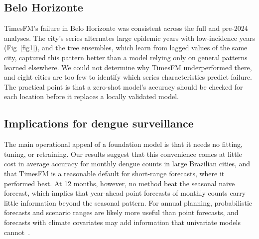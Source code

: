 \documentclass[10pt,letterpaper]{article}
\begin{document}
\subsection*{Belo Horizonte}
TimesFM's failure in Belo Horizonte was consistent across the full and pre-2024 analyses. The city's series alternates large epidemic years with low-incidence years (Fig~\ref{fig1}), and the tree ensembles, which learn from lagged values of the same city, captured this pattern better than a model relying only on general patterns learned elsewhere. We could not determine why TimesFM underperformed there, and eight cities are too few to identify which series characteristics predict failure. The practical point is that a zero-shot model's accuracy should be checked for each location before it replaces a locally validated model.

\subsection*{Implications for dengue surveillance}
The main operational appeal of a foundation model is that it needs no fitting, tuning, or retraining. Our results suggest that this convenience comes at little cost in average accuracy for monthly dengue counts in large Brazilian cities, and that TimesFM is a reasonable default for short-range forecasts, where it performed best. At 12 months, however, no method beat the seasonal naive forecast, which implies that year-ahead point forecasts of monthly counts carry little information beyond the seasonal pattern. For annual planning, probabilistic forecasts and scenario ranges are likely more useful than point forecasts, and forecasts with climate covariates may add information that univariate models cannot~\cite{Barcellos2024,Fang2024}.
\end{document}
